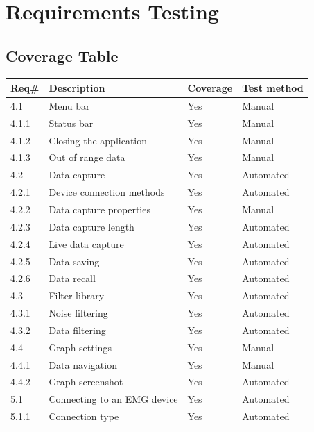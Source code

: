 \documentclass[12pt,a4paper]{article}
\begin{document}
\newpage

\section{Requirements Testing}

\subsection{Coverage Table}

\begin{table}[htbp]
	\centering
	
	\begin{tabular}{|l|l|l|l|}
		\hline
		\textbf{Req\#} & \textbf{Description} & \textbf{Coverage} & \textbf{Test method}\\
		\hline
		4.1 & Menu bar & Yes & Manual\\
		\hline
		4.1.1 & Status bar & Yes & Manual \\
		\hline
		4.1.2 & Closing the application & Yes & Manual \\
		\hline
		4.1.3 & Out of range data & Yes & Manual \\
		\hline
		4.2 & Data capture & Yes & Automated \\
		\hline
		4.2.1 & Device connection methods & Yes & Automated \\
		\hline
		4.2.2 & Data capture properties & Yes & Manual \\
		\hline
		4.2.3 & Data capture length & Yes & Automated \\
		\hline
		4.2.4 & Live data capture & Yes & Automated \\
		\hline
		4.2.5 & Data saving & Yes & Automated \\
		\hline
		4.2.6 & Data recall & Yes & Automated \\
		\hline
		4.3 & Filter library & Yes & Automated \\
		\hline
		4.3.1 & Noise filtering & Yes & Automated \\
		\hline
		4.3.2 & Data filtering & Yes & Automated \\
		\hline
		4.4 & Graph settings & Yes & Manual \\
		\hline
		4.4.1 & Data navigation & Yes & Manual \\
		\hline
		4.4.2 & Graph screenshot & Yes & Automated \\
		\hline
		5.1 & Connecting to an EMG device & Yes & Automated \\
		\hline
		5.1.1 & Connection type & Yes & Automated \\

\end{tabular}
\end{table}
\end{document}
